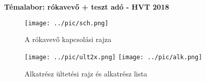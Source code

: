 \documentclass[12pt,a4paper]{article}
\begin{document}
\centering\Large\textbf{Témalabor: rókavevő + teszt adó - HVT 2018}

\begin{figure}[!h]
\centering
\texttt{[image: ../pic/sch.png]}
\caption{A rókavevő kapcsolási rajza}
\end{figure}

\begin{figure}[!h]
\centering
\texttt{[image: ../pic/ult2x.png]}
\texttt{[image: ../pic/alk.png]}
\caption{Alkatrész ültetési rajz és alkatrész lista}
\end{figure}
\end{document}
